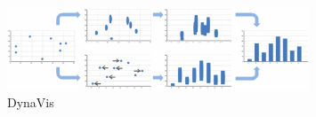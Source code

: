 \begin{figure}[!htb]
\centering
\includegraphics[width=0.8\textwidth, keepaspectratio]{images/methods/related/dynavis.png}
\caption[
    DynaVis 
]{DynaVis}
\label{fig:dynavis}
\end{figure}







